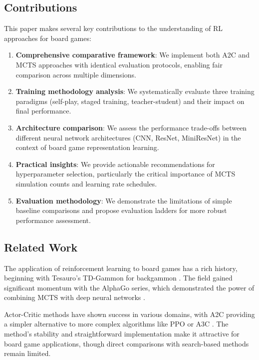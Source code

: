 \documentclass[conference]{IEEEtran}
\begin{document}
\subsection{Contributions}

This paper makes several key contributions to the understanding of RL approaches for board games:

\begin{enumerate}
\item \textbf{Comprehensive comparative framework}: We implement both A2C and MCTS approaches with identical evaluation protocols, enabling fair comparison across multiple dimensions.

\item \textbf{Training methodology analysis}: We systematically evaluate three training paradigms (self-play, staged training, teacher-student) and their impact on final performance.

\item \textbf{Architecture comparison}: We assess the performance trade-offs between different neural network architectures (CNN, ResNet, MiniResNet) in the context of board game representation learning.

\item \textbf{Practical insights}: We provide actionable recommendations for hyperparameter selection, particularly the critical importance of MCTS simulation counts and learning rate schedules.

\item \textbf{Evaluation methodology}: We demonstrate the limitations of simple baseline comparisons and propose evaluation ladders for more robust performance assessment.
\end{enumerate}

\subsection{Related Work}

The application of reinforcement learning to board games has a rich history, beginning with Tesauro's TD-Gammon for backgammon \cite{tdgammon}. The field gained significant momentum with the AlphaGo series, which demonstrated the power of combining MCTS with deep neural networks \cite{alphago, alphago_zero}. 

Actor-Critic methods have shown success in various domains, with A2C providing a simpler alternative to more complex algorithms like PPO or A3C \cite{a2c_paper}. The method's stability and straightforward implementation make it attractive for board game applications, though direct comparisons with search-based methods remain limited.
\end{document}
